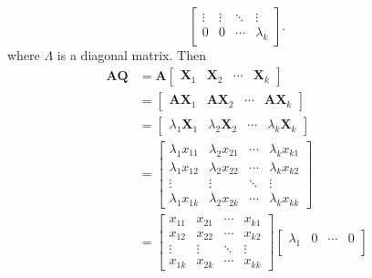 \documentclass[oneside]{book}
\begin{document}
{{{\[\begin{bmatrix}
                    \vdots      & \vdots      & \ddots & \vdots\\
                    0           & 0           & \cdots & \lambda_{k}
                \end{bmatrix}
                .
        \]
        where $\Lambda$ is a diagonal matrix. Then
        \begin{align}
            \mathbf{A}\mathbf{Q}&=
                \mathbf{A}
                \begin{bmatrix}
                    \mathbf{X}_{1} & \mathbf{X}_{2} & \cdots & \mathbf{X}_{k}
                \end{bmatrix}\\
                &=
                \begin{bmatrix}
                    \mathbf{A}\mathbf{X}_{1} & \mathbf{A}\mathbf{X}_{2} & \cdots & \mathbf{A}\mathbf{X}_{k}
                \end{bmatrix}\\
                &=
                \begin{bmatrix}
                    \lambda_{1}\mathbf{X}_{1} & \lambda_{2}\mathbf{X}_{2} & \cdots & \lambda_{k}\mathbf{X}_{k}
                \end{bmatrix}\\
                &=
                \begin{bmatrix}
                    \lambda_{1}x_{11} & \lambda_{2}x_{21} & \cdots & \lambda_{k}x_{k1}\\
                    \lambda_{1}x_{12} & \lambda_{2}x_{22} & \cdots & \lambda_{k}x_{k2}\\
                    \vdots            & \vdots            & \ddots & \vdots\\
                    \lambda_{1}x_{1k} & \lambda_{2}x_{2k} & \cdots & \lambda_{k}x_{kk}
                \end{bmatrix}\\
                &=
                \begin{bmatrix}
                    x_{11} & x_{21} & \cdots & x_{k1}\\
                    x_{12} & x_{22} & \cdots & x_{k2}\\
                    \vdots & \vdots & \ddots & \vdots\\
                    x_{1k} & x_{2k} & \cdots & x_{kk}
                \end{bmatrix}
                \begin{bmatrix}
                    \lambda_{1} & 0           & \cdots & 0\\

\end{bmatrix}
\end{align}}}}
\end{document}
